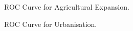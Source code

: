 
\begin{figure}[h!]
 \caption{ROC Curve for Agricultural Expansion.}
 \label{fig:roc_agex}
\end{figure}


\begin{figure}[h!]
 \caption{ROC Curve for Urbanisation.}
 \label{fig:roc_urb}
\end{figure}

